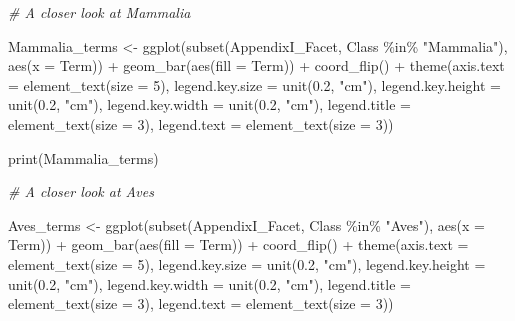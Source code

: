 \documentclass[
  12pt,
]{article}
\newenvironment{Shaded}{\begin{snugshade}}{\end{snugshade}}
\newcommand{\AttributeTok}[1]{\textcolor[rgb]{0.77,0.63,0.00}{#1}}
\newcommand{\CommentTok}[1]{\textcolor[rgb]{0.56,0.35,0.01}{\textit{#1}}}
\newcommand{\DecValTok}[1]{\textcolor[rgb]{0.00,0.00,0.81}{#1}}
\newcommand{\FloatTok}[1]{\textcolor[rgb]{0.00,0.00,0.81}{#1}}
\newcommand{\FunctionTok}[1]{\textcolor[rgb]{0.00,0.00,0.00}{#1}}
\newcommand{\NormalTok}[1]{#1}
\newcommand{\OtherTok}[1]{\textcolor[rgb]{0.56,0.35,0.01}{#1}}
\newcommand{\SpecialCharTok}[1]{\textcolor[rgb]{0.00,0.00,0.00}{#1}}
\newcommand{\StringTok}[1]{\textcolor[rgb]{0.31,0.60,0.02}{#1}}
\begin{document}
\begin{Shaded}
\begin{Highlighting}[]
\CommentTok{\# A closer look at Mammalia}

\NormalTok{Mammalia\_terms }\OtherTok{\textless{}{-}} \FunctionTok{ggplot}\NormalTok{(}\FunctionTok{subset}\NormalTok{(AppendixI\_Facet, Class }\SpecialCharTok{\%in\%} \StringTok{"Mammalia"}\NormalTok{), }\FunctionTok{aes}\NormalTok{(}\AttributeTok{x =}\NormalTok{ Term)) }\SpecialCharTok{+}
    \FunctionTok{geom\_bar}\NormalTok{(}\FunctionTok{aes}\NormalTok{(}\AttributeTok{fill =}\NormalTok{ Term)) }\SpecialCharTok{+} \FunctionTok{coord\_flip}\NormalTok{() }\SpecialCharTok{+} \FunctionTok{theme}\NormalTok{(}\AttributeTok{axis.text =} \FunctionTok{element\_text}\NormalTok{(}\AttributeTok{size =} \DecValTok{5}\NormalTok{),}
    \AttributeTok{legend.key.size =} \FunctionTok{unit}\NormalTok{(}\FloatTok{0.2}\NormalTok{, }\StringTok{"cm"}\NormalTok{), }\AttributeTok{legend.key.height =} \FunctionTok{unit}\NormalTok{(}\FloatTok{0.2}\NormalTok{, }\StringTok{"cm"}\NormalTok{), }\AttributeTok{legend.key.width =} \FunctionTok{unit}\NormalTok{(}\FloatTok{0.2}\NormalTok{,}
        \StringTok{"cm"}\NormalTok{), }\AttributeTok{legend.title =} \FunctionTok{element\_text}\NormalTok{(}\AttributeTok{size =} \DecValTok{3}\NormalTok{), }\AttributeTok{legend.text =} \FunctionTok{element\_text}\NormalTok{(}\AttributeTok{size =} \DecValTok{3}\NormalTok{))}

\FunctionTok{print}\NormalTok{(Mammalia\_terms)}

\CommentTok{\# A closer look at Aves}

\NormalTok{Aves\_terms }\OtherTok{\textless{}{-}} \FunctionTok{ggplot}\NormalTok{(}\FunctionTok{subset}\NormalTok{(AppendixI\_Facet, Class }\SpecialCharTok{\%in\%} \StringTok{"Aves"}\NormalTok{), }\FunctionTok{aes}\NormalTok{(}\AttributeTok{x =}\NormalTok{ Term)) }\SpecialCharTok{+}
    \FunctionTok{geom\_bar}\NormalTok{(}\FunctionTok{aes}\NormalTok{(}\AttributeTok{fill =}\NormalTok{ Term)) }\SpecialCharTok{+} \FunctionTok{coord\_flip}\NormalTok{() }\SpecialCharTok{+} \FunctionTok{theme}\NormalTok{(}\AttributeTok{axis.text =} \FunctionTok{element\_text}\NormalTok{(}\AttributeTok{size =} \DecValTok{5}\NormalTok{),}
    \AttributeTok{legend.key.size =} \FunctionTok{unit}\NormalTok{(}\FloatTok{0.2}\NormalTok{, }\StringTok{"cm"}\NormalTok{), }\AttributeTok{legend.key.height =} \FunctionTok{unit}\NormalTok{(}\FloatTok{0.2}\NormalTok{, }\StringTok{"cm"}\NormalTok{), }\AttributeTok{legend.key.width =} \FunctionTok{unit}\NormalTok{(}\FloatTok{0.2}\NormalTok{,}
        \StringTok{"cm"}\NormalTok{), }\AttributeTok{legend.title =} \FunctionTok{element\_text}\NormalTok{(}\AttributeTok{size =} \DecValTok{3}\NormalTok{), }\AttributeTok{legend.text =} \FunctionTok{element\_text}\NormalTok{(}\AttributeTok{size =} \DecValTok{3}\NormalTok{))}


\end{Highlighting}
\end{Shaded}
\end{document}
